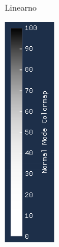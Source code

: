 \documentclass[times, utf8, diplomski]{fer}
\begin{document}
\begin{figure} [H]
\begin{subfigure}[h]{0.16\textwidth}
         \caption{Linearno}
         \label{fig:linear_legend}
     \end{subfigure}
     \hfill
     \begin{subfigure}[h]{0.16\textwidth}
         \centering
         \includegraphics[width=\textwidth]{cubic_colormap.png}

\end{subfigure}
\end{figure}
\end{document}
